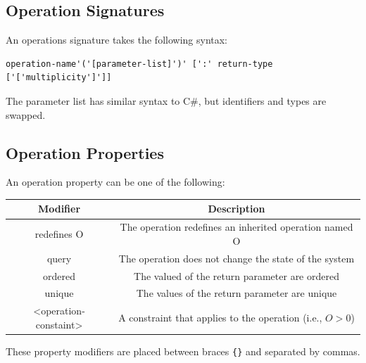 \documentclass{article}
\begin{document}
\subsection{Operation Signatures}
An operations signature takes the following syntax:
\begin{lstlisting}[numbers=none]
operation-name'('[parameter-list]')' [':' return-type ['['multiplicity']']]
\end{lstlisting}
The parameter list has similar syntax to C\#, but identifiers and types are swapped.
\subsection{Operation Properties}
An operation property can be one of the following:
\begin{table}[H]
    \centering
    \begin{tabular}{c c}
        \toprule
        \textbf{Modifier}     & \textbf{Description}                                       \\
        \midrule
        redefines O           & The operation redefines an inherited operation named O     \\
        query                 & The operation does not change the state of the system      \\
        ordered               & The valued of the return parameter are ordered             \\
        unique                & The values of the return parameter are unique              \\
        <operation-constaint> & A constraint that applies to the operation (i.e., \(O>0\)) \\
        \bottomrule
    \end{tabular}
\end{table}
These property modifiers are placed between braces \lstinline!{}! and separated by commas.
\end{document}
